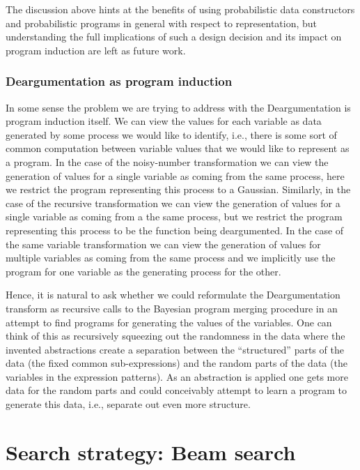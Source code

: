 \documentclass[a4paper,10pt]{article}
\begin{document}
The discussion above hints at the benefits of using probabilistic data constructors and probabilistic programs in general with respect to representation, but understanding the full implications of such a design decision and its impact on program induction are left as future work.


\subsubsection{Deargumentation as program induction}

In some sense the problem we are trying to address with the Deargumentation is program induction itself.  We can view the values for each variable as data generated by some process we would like to identify, i.e., there is some sort of common computation between variable values that we would like to represent as a program.  In the case of the noisy-number transformation we can view the generation of values for a single variable as coming from the same process, here we restrict the program representing this process to a Gaussian.  Similarly, in the case of the recursive transformation we can view the generation of values for a single variable as coming from a the same process, but we restrict the program representing this process to be the function being deargumented.  In the case of the same variable transformation we can view the generation of values for multiple variables as coming from the same process and we implicitly use the program for one variable as the generating process for the other.  

Hence, it is natural to ask whether we could reformulate the Deargumentation transform as recursive calls to the Bayesian program merging procedure in an attempt to find programs for generating the values of the variables.  One can think of this as recursively squeezing out the randomness in the data where the invented abstractions create a separation between the ``structured'' parts of the data (the fixed common sub-expressions) and the random parts of the data (the variables in the expression patterns).  As an abstraction is applied one gets more data for the random parts and could conceivably attempt to learn a program to generate this data, i.e., separate out even more structure.


\newpage
\section{Search strategy: Beam search}
\end{document}
